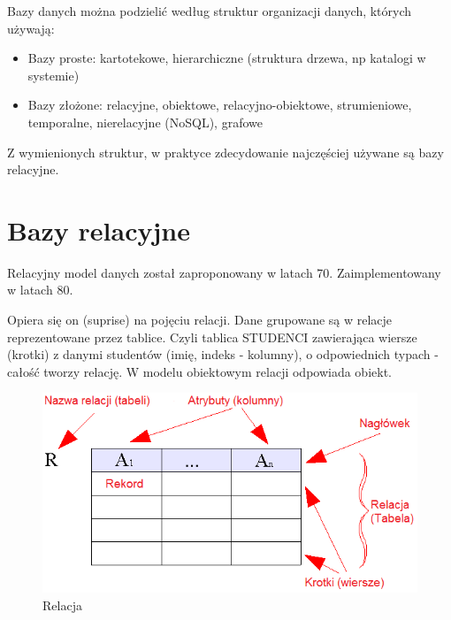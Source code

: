 \documentclass[a4paper,twoside]{report}
\begin{document}
Bazy danych można podzielić według struktur organizacji danych, których używają:

\begin{itemize}
\item Bazy proste: kartotekowe, hierarchiczne (struktura drzewa, np katalogi w systemie)
\item Bazy złożone: relacyjne, obiektowe, relacyjno-obiektowe, strumieniowe, temporalne, nierelacyjne (NoSQL), grafowe
\end{itemize}

Z wymienionych struktur, w praktyce zdecydowanie najczęściej używane są bazy relacyjne.
\medskip


\section{Bazy relacyjne}
Relacyjny model danych został zaproponowany w latach 70. Zaimplementowany w latach 80. 

Opiera się on (suprise) na pojęciu relacji. Dane grupowane są w relacje reprezentowane przez tablice. Czyli tablica STUDENCI zawierająca wiersze (krotki) z danymi studentów (imię, indeks - kolumny), o odpowiednich typach - całość tworzy relację.
W modelu obiektowym relacji odpowiada obiekt. \\

\begin{figure}[htbp]
	\centering
	\includegraphics[scale=0.7]{obrazy/bazy/Relational_model_concepts_PL.png}
	\caption{Relacja}
\end{figure}
\end{document}
